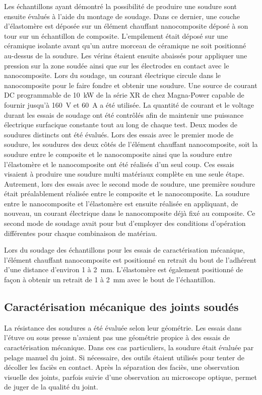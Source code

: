 Les échantillons ayant démontré la possibilité de produire une soudure sont ensuite évalués à l'aide du montage de soudage. 
Dans ce dernier, une couche d'élastomère est déposée sur un élément chauffant nanocomposite déposé à son tour sur un échantillon de composite. 
L'empilement était déposé sur une céramique isolante avant qu'un autre morceau de céramique ne soit positionné au-dessus de la soudure. 
Les vérins étaient ensuite abaissés pour appliquer une pression sur la zone soudée ainsi que sur les électrodes en contact avec le nanocomposite. 
Lors du soudage, un courant électrique circule dans le nanocomposite pour le faire fondre et obtenir une soudure. 
Une source de courant DC programmable de \SI{10}{\kW} de la série XR de chez Magna-Power capable de fournir jusqu'à \SI{160}{\volt} et \SI{60}{\ampere} a été utilisée. 
La quantité de courant et le voltage durant les essais de soudage ont été contrôlés afin de maintenir une puissance électrique surfacique constante tout au long de chaque test. 
Deux modes de soudures distincts ont été évalués. 
Lors des essais avec le premier mode de soudure, les soudures des deux côtés de l'élément chauffant nanocomposite, soit la soudure entre le composite et le nanocomposite ainsi que la soudure entre l'élastomère et le nanocomposite ont été réalisés d'un seul coup. 
Ces essais visaient à produire une soudure multi matériaux complète en une seule étape. 
Autrement, lors des essais avec le second mode de soudure, une première soudure était préalablement réalisée entre le composite et le nanocomposite. 
La soudure entre le nanocomposite et l'élastomère est ensuite réalisée en appliquant, de nouveau, un courant électrique dans le nanocomposite déjà fixé au composite. 
Ce second mode de soudage avait pour but d'employer des conditions d'opération différentes pour chaque combinaison de matériau. 

Lors du soudage des échantillons pour les essais de caractérisation mécanique, l'élément chauffant nanocomposite est positionné en retrait du bout de l'adhérent d'une distance d'environ 1 à \SI{2}{\milli\metre}. 
L'élastomère est également positionné de façon à obtenir un retrait de 1 à \SI{2}{\milli\metre} avec le bout de l'échantillon. 

\subsection{Caractérisation mécanique des joints soudés}

La résistance des soudures a été évaluée selon leur géométrie. 
Les essais dans l'étuve ou sous presse n'avaient pas une géométrie propice à des essais de caractérisation mécanique. 
Dans ces cas particuliers, la soudure était évaluée par pelage manuel du joint. 
Si nécessaire, des outils étaient utilisés pour tenter de décoller les faciès en contact. 
Après la séparation des faciès, une observation visuelle des joints, parfois suivie d'une observation au microscope optique, permet de juger de la qualité du joint. 

